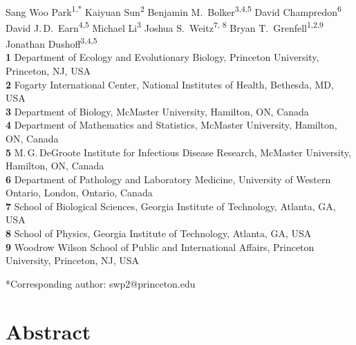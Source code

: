 \documentclass[12pt]{article}
\date{\today}
\begin{document}
\begin{flushleft}{
	\Large
	\textbf{}
}
\newline
\\
Sang Woo Park\textsuperscript{1,*}
Kaiyuan Sun\textsuperscript{2}
Benjamin M.\ Bolker\textsuperscript{3,4,5}
David Champredon\textsuperscript{6}
David J.\,D.\ Earn\textsuperscript{4,5}
Michael Li\textsuperscript{3}
Joshua S.\ Weitz\textsuperscript{7, 8}
Bryan T.\ Grenfell\textsuperscript{1,2,9}
Jonathan Dushoff\textsuperscript{3,4,5}
\\
\bigskip
\textbf{1} Department of Ecology and Evolutionary Biology, Princeton University, Princeton, NJ, USA
\\
\textbf{2} Fogarty International Center, National Institutes of Health, Bethesda, MD, USA
\\
\textbf{3} Department of Biology, McMaster University, Hamilton, ON, Canada
\\
\textbf{4} Department of Mathematics and Statistics, McMaster University, Hamilton, ON, Canada
\\
\textbf{5} M.\,G.\,DeGroote Institute for Infectious Disease Research, McMaster University, Hamilton, ON, Canada
\\
\textbf{6} Department of Pathology and Laboratory Medicine, University of Western Ontario, London, Ontario, Canada
\\
\textbf{7} School of Biological Sciences, Georgia Institute of Technology, Atlanta, GA, USA
\\
\textbf{8} School of Physics, Georgia Institute of Technology, Atlanta, GA, USA
\\
\textbf{9} Woodrow Wilson School of Public and International Affairs, Princeton University, Princeton, NJ, USA
\\
\bigskip

*Corresponding author: swp2@princeton.edu
\end{flushleft}

\section*{Abstract}
\end{document}
